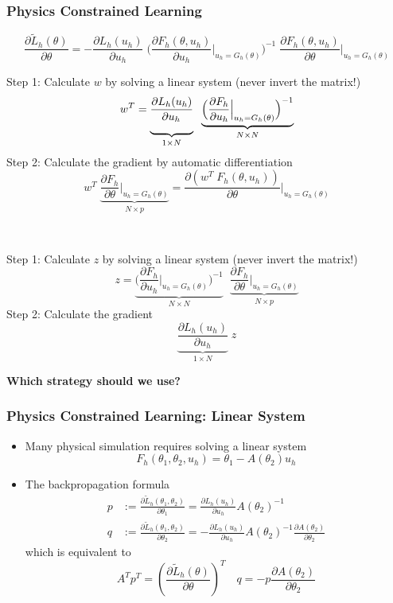 \documentclass{beamer}
\begin{document}
\begin{frame}
	\frametitle{Physics Constrained Learning}	
	{\scriptsize$$\boxed{\frac{{\partial {{\tilde L}_h}(\theta )}}{{\partial \theta }} 
    = - \frac{{\partial {L_h}({u_h})}}{{\partial {u_h}}} \;
    \Big( {\frac{{\partial {F_h(\theta, u_h)}}}{{\partial {u_h}}}\Big|_{u_h = {G_h}(\theta )}} \Big)^{ - 1} \;
    \frac{{\partial {F_h(\theta, u_h)}}}{{\partial \theta }}\Big|_{u_h = {G_h}(\theta )}}$$}
	\begin{minipage}[t]{0.48\textwidth}
		Step 1: Calculate $w$ by solving a linear system (never invert the matrix!)
{\scriptsize$$w^T = \underbrace{\frac{{\partial {L_h}({u_h})}}{{\partial {u_h}}\rule[-9pt]{1pt}{0pt}}}_{1\times N} 
        \;\;
        \underbrace{\Big( {\frac{{\partial {F_h}}}{{\partial {u_h}}}\Big|_{u_h = {G_h}(\theta )}} \Big)^{ - 1}}_{N\times N}$$}
Step 2: Calculate the gradient by automatic differentiation 
{\scriptsize$$w^T\;\underbrace{\frac{{\partial {F_h}}}{{\partial \theta }}\Big|_{u_h = {G_h}(\theta )}}_{N\times p} = \frac{\partial (w^T\;  {F_h}(\theta, u_h))}{\partial \theta }\Bigg|_{u_h = {G_h}(\theta )}$$}
	\end{minipage}\hfill\vline\hfill~
	\begin{minipage}[t]{0.48\textwidth}
		Step 1: Calculate $z$ by solving a linear system (never invert the matrix!)
		{\scriptsize$$z = \underbrace{
            \Big( {\frac{{\partial {F_h}}}{{\partial {u_h}}}\Big|_{u_h = {G_h}(\theta )}} \Big)^{ - 1}}_{N\times N}
            \;\; \underbrace{\frac{{\partial {F_h}}}{{\partial \theta }}\Big|_{u_h = {G_h}(\theta )}}_{N\times p}$$}
           Step 2: Calculate the gradient
           {\scriptsize$$\underbrace{\frac{{\partial {L_h}({u_h})}}{{\partial {u_h}}}}_{1\times N}\; z$$}
	\end{minipage}
	\begin{center}
		\textbf{Which strategy should we use?}
	\end{center}
\end{frame}

\begin{frame}
	\frametitle{Physics Constrained Learning: Linear System}
	
	\begin{itemize}
		\item Many physical simulation requires solving a linear system 
		$$F_h(\theta_1,\theta_2, u_h) = \theta_1 - A(\theta_2)u_h$$
		\item The backpropagation formula
		\begin{align*}
			p &:=\frac{\partial \tilde L_h(\theta_1, \theta_2)}{\partial \theta_1} = \frac{\partial L_h(u_h)}{\partial u_h}A(\theta_2)^{-1}\\
			q &:=\frac{\partial \tilde L_h(\theta_1, \theta_2)}{\partial \theta_2} = -\frac{\partial L_h(u_h)}{\partial u_h}A(\theta_2)^{-1} \frac{\partial A(\theta_2)}{\partial \theta_2}
		\end{align*}
		which is equivalent to 
		$$A^T p^T =\left( \frac{\partial \tilde L_h(\theta)}{\partial \theta} \right)^T\quad q = -p\frac{\partial A(\theta_2)}{\partial \theta_2} $$
	\end{itemize}
	
\end{frame}
\end{document}
